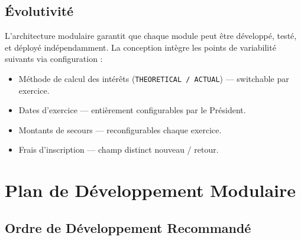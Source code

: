\documentclass[12pt, a4paper]{report}
\begin{document}
\section{Évolutivité}

L'architecture modulaire garantit que chaque module peut être développé, testé, et déployé
indépendamment. La conception intègre les points de variabilité suivants via configuration :
\begin{itemize}
  \item Méthode de calcul des intérêts (\texttt{THEORETICAL / ACTUAL}) — switchable par exercice.
  \item Dates d'exercice — entièrement configurables par le Président.
  \item Montants de secours — reconfigurables chaque exercice.
  \item Frais d'inscription — champ distinct nouveau / retour.
\end{itemize}

\chapter{Plan de Développement Modulaire}

\section{Ordre de Développement Recommandé}
\end{document}
